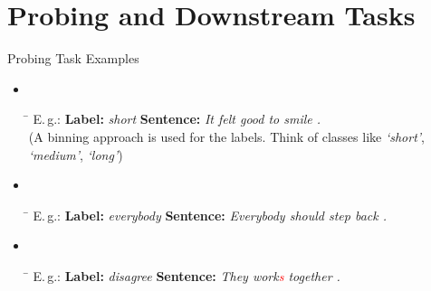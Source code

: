 \documentclass[accentcolor=tud1a,colorbacktitle,inverttitle,landscape,german,presentation,t]{tudbeamer}
\begin{document}
\section{Probing and Downstream Tasks}

\begin{frame}{Probing Task Examples}{}
	\vspace*{-4mm}
	\begin{itemize}\setlength\itemsep{1em}
		\item {} \\ \vspace*{2mm}
		\begin{tabbing}
			\hspace*{4cm}\=\kill
				E.\,g.: \textbf{Label:} \textit{short} \> \textbf{Sentence:} \textit{It felt good to smile .} \\
			{\footnotesize (A binning approach is used for the labels.
			Think of classes like \textit{`short'}, \textit{`medium'}, \textit{`long'})}
		\end{tabbing}\vspace*{2mm}
		\item {} \\ \vspace*{2mm}
		\begin{tabbing}
			\hspace*{4cm}\=\kill
			E.\,g.: \textbf{Label:} \textit{everybody} \> \textbf{Sentence:} \textit{Everybody should step back .}
		\end{tabbing}\vspace*{2mm}
		\item {} \\ \vspace*{2mm}
		\begin{tabbing}
			\hspace*{4cm}\=\kill
			E.\,g.: \textbf{Label:} \textit{disagree} \> \textbf{Sentence:} \textit{They work\textcolor{red}{s} together .}
		\end{tabbing}
	\end{itemize}
\end{frame}
\end{document}
